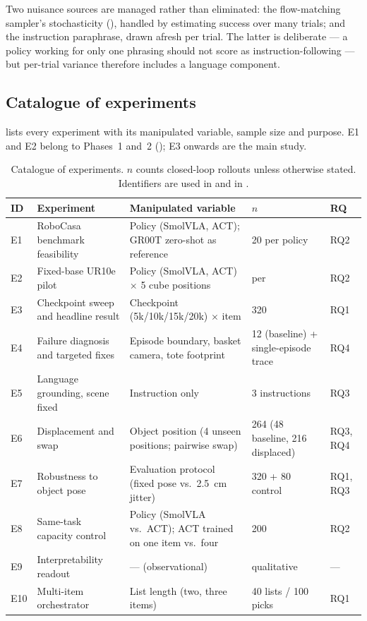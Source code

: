Two nuisance sources are managed rather than eliminated: the flow-matching sampler's
stochasticity (), handled by estimating success over many trials;
and the instruction paraphrase, drawn afresh per trial. The latter is deliberate --- a
policy working for only one phrasing should not score as instruction-following --- but
per-trial variance therefore includes a language component.

\subsection{Catalogue of experiments}
\label{sec:m-catalogue}
 lists every experiment with its manipulated variable, sample
size and purpose. E1 and E2 belong to Phases~1 and~2 (); E3
onwards are the main study.

\begin{table}[ht]
\caption{Catalogue of experiments. $n$ counts closed-loop rollouts unless otherwise
stated. Identifiers are used in  and in .}
\begin{center}
\begin{tabular}{p{}p{}p{}p{}p{}}
\toprule
ID & Experiment & Manipulated variable & $n$ & RQ \\
\midrule
E1 & RoboCasa benchmark feasibility &
Policy (SmolVLA, ACT); GR00T zero-shot as reference &
20 per policy & RQ2 \\
\addlinespace
E2 & Fixed-base UR10e pilot &
Policy (SmolVLA, ACT) $\times$ 5 cube positions &
per {sec:results-journey} & RQ2 \\
\addlinespace
E3 & Checkpoint sweep and headline result &
Checkpoint (5k/10k/15k/20k) $\times$ item &
320 & RQ1 \\
\addlinespace
E4 & Failure diagnosis and targeted fixes &
Episode boundary, basket camera, tote footprint &
12 (baseline) + single-episode trace & RQ4 \\
\addlinespace
E5 & Language grounding, scene fixed &
Instruction only &
3 instructions & RQ3 \\
\addlinespace
E6 & Displacement and swap &
Object position (4 unseen positions; pairwise swap) &
264 (48 baseline, 216 displaced) & RQ3, RQ4 \\
\addlinespace
E7 & Robustness to object pose &
Evaluation protocol (fixed pose vs.\ \SI{2.5}{cm} jitter) &
320 + 80 control & RQ1, RQ3 \\
\addlinespace
E8 & Same-task capacity control &
Policy (SmolVLA vs.\ ACT); ACT trained on one item vs.\ four &
200 & RQ2 \\
\addlinespace
E9 & Interpretability readout &
--- (observational) &
qualitative & --- \\
\addlinespace
E10 & Multi-item orchestrator &
List length (two, three items) &
40 lists / 100 picks & RQ1 \\
\bottomrule
\end{tabular}
\end{center}
\label{tab:experiments}
\end{table}

